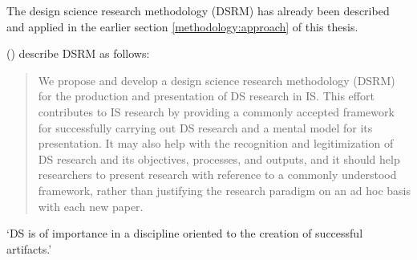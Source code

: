 The
design science research methodology (DSRM)
has already been described and applied in the earlier section
\ref{methodology:approach} 
of this thesis.

\citeauthor{designScienceResearchMethodologyForInformationSystemsResearch} (\citeyear{designScienceResearchMethodologyForInformationSystemsResearch})
describe DSRM as follows:

\begin{quotation}
\noindent
We propose and develop a design science research methodology (DSRM) for the
production and presentation of DS research in IS. This effort contributes to IS research
by providing a commonly accepted framework for successfully carrying out DS research
and a mental model for its presentation. It may also help with the recognition
and legitimization of DS research and its objectives, processes, and outputs, and it
should help researchers to present research with reference to a commonly understood
framework, rather than justifying the research paradigm on an ad hoc basis with each
new paper.

\noindent
\autocite{designScienceResearchMethodologyForInformationSystemsResearch}
\end{quotation}

\enquote*{DS is of importance in a discipline oriented to the creation of successful artifacts.}
\autocite{designScienceResearchMethodologyForInformationSystemsResearch}




















